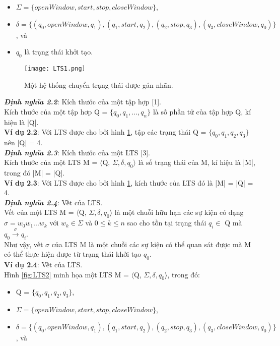 \documentclass[a4paper,13pt,oneside,openany]{book}
\begin{document}
\begin{flushleft}
\begin{itemize}
			\item $\Sigma = \{openWindow, start, stop, closeWindow\}$,
			\item $\delta = \{(q_0, openWindow, q_1), (q_1, start, q_2), (q_2, stop, q_3), (q_3, closeWindow, q_0)\}$, và
			\item $q_0$ là trạng thái khởi tạo.
		\end{itemize}
		\begin{figure}[h]
			\centering
			\texttt{[image: LTS1.png]}
			\caption{Một hệ thống chuyển trạng thái được gán nhãn.}
			\label{fig:LTS1}
		\end{figure}
		\noindent
		\textbf{\textit{Định nghĩa 2.2}}: Kích thước của một tập hợp [1].\\
		Kích thước của một tập hơp Q = $\{q_0, q_1, ..., q_n\}$ là số phần tử của tập hợp Q, kí hiệu là |Q|.\\
		\textbf{Ví dụ 2.2}: Với LTS được cho bởi hình \ref{fig:LTS1}, tập các trạng thái Q = $\{q_0, q_1, q_2, q_3\}$ nên |Q| = 4.\\
		\textbf{\textit{Định nghĩa 2.3}}: Kích thước của một LTS [3].\\
		Kích thước của một LTS M = $\langle$Q, $\Sigma, \delta, q_{0} \rangle$ là số trạng thái của M, kí hiệu là |M|, trong đó |M| = |Q|.\\
		\textbf{Ví dụ 2.3}: Với LTS được cho bởi hình \ref{fig:LTS1}, kích thước của LTS đó là |M| = |Q| = 4.\\
		\textbf{\textit{Định nghĩa 2.4}}: Vết của LTS.\\
		Vết của một LTS M = $\langle$Q, $\Sigma, \delta, q_{0} \rangle$ là một chuỗi hữu hạn các sự kiện có dạng $\sigma = w_0w_1...w_k$ với $w_k \in \Sigma$ và $0 \leq k \leq n$ sao cho tồn tại trạng thái $q_i \in$ Q mà $q_0 \overset{\sigma}{\longrightarrow} q_{i}$.\\
		Như vậy, vết $\sigma$ của LTS M là một chuỗi các sự kiện có thể quan sát được mà M có thể thực hiện được từ trạng thái khởi tạo $q_0$.\\
		\textbf{Ví dụ 2.4}: Vết của LTS.\\
		Hình \ref{fig:LTS2} minh họa một LTS M = $\langle$Q, $\Sigma, \delta, q_{0} \rangle$, trong đó:
		\begin{itemize}
			\item Q = $\{q_0, q_1, q_2, q_3\}$,
			\item $\Sigma = \{openWindow, start, stop, closeWindow\}$,
			\item $\delta = \{(q_0, openWindow, q_1), (q_1, start, q_2), (q_2, stop, q_3), (q_3, closeWindow, q_0)\}$, và

\end{itemize}
\end{flushleft}
\end{document}
